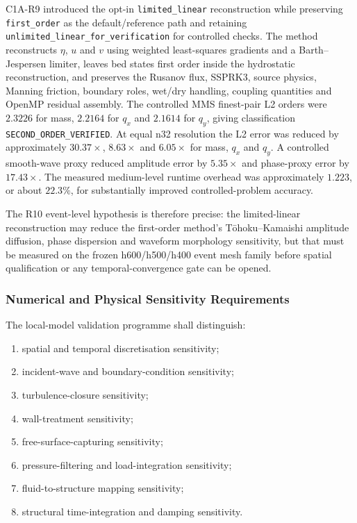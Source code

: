 C1A-R9 introduced the opt-in \texttt{limited\_linear} reconstruction
while preserving \texttt{first\_order} as the default/reference path and
retaining \texttt{unlimited\_linear\_for\_verification} for controlled
checks. The method reconstructs $\eta$, $u$ and $v$ using weighted
least-squares gradients and a Barth--Jespersen limiter, leaves bed
states first order inside the hydrostatic reconstruction, and preserves
the Rusanov flux, SSPRK3, source physics, Manning friction, boundary
roles, wet/dry handling, coupling quantities and OpenMP residual
assembly. The controlled MMS finest-pair L2 orders were $2.3226$ for
mass, $2.2164$ for $q_x$ and $2.1614$ for $q_y$, giving classification
\texttt{SECOND\_ORDER\_VERIFIED}. At equal n32 resolution the L2 error
was reduced by approximately $30.37\times$, $8.63\times$ and
$6.05\times$ for mass, $q_x$ and $q_y$. A controlled smooth-wave proxy
reduced amplitude error by $5.35\times$ and phase-proxy error by
$17.43\times$. The measured medium-level runtime overhead was
approximately $1.223$, or about $22.3\%$, for substantially improved
controlled-problem accuracy.

The R10 event-level hypothesis is therefore precise: the
limited-linear reconstruction may reduce the first-order method's
Tōhoku--Kamaishi amplitude diffusion, phase dispersion and waveform
morphology sensitivity, but that must be measured on the frozen
h600/h500/h400 event mesh family before spatial qualification or any
temporal-convergence gate can be opened.

\subsubsection{Numerical and Physical Sensitivity Requirements}
\label{sec:res-ver-cnv-local-sensitivity-requirements}

The local-model validation programme shall distinguish:

\begin{enumerate}
  \item spatial and temporal discretisation sensitivity;
  \item incident-wave and boundary-condition sensitivity;
  \item turbulence-closure sensitivity;
  \item wall-treatment sensitivity;
  \item free-surface-capturing sensitivity;
  \item pressure-filtering and load-integration sensitivity;
  \item fluid-to-structure mapping sensitivity;
  \item structural time-integration and damping sensitivity.
\end{enumerate}

